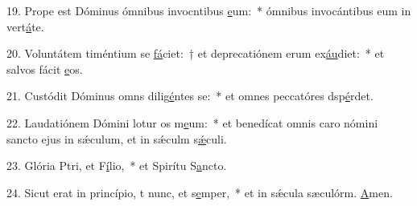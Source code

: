 19. Prope est Dóminus ómnibus invocntibus \uline{e}um:~* ómnibus invocántibus eum in vert\uline{á}te.\par 
20. Voluntátem timéntium se \uline{fá}ciet:~† et deprecatiónem erum ex\uline{áu}diet:~* et salvos fácit \uline{e}os.\par 
21. Custódit Dóminus omns dilig\uline{é}ntes se:~* et omnes peccatóres dsp\uline{é}rdet.\par 
22. Laudatiónem Dómini lotur os m\uline{e}um:~* et benedícat omnis caro nómini sancto ejus in sǽculum, et in sǽculm s\uline{ǽ}culi.\par 
23. Glória Ptri, et F\uline{í}lio,~* et Spirítu S\uline{a}ncto.\par 
24. Sicut erat in princípio, t nunc, et s\uline{e}mper,~* et in sǽcula sæculórm. \uline{A}men.\par 
